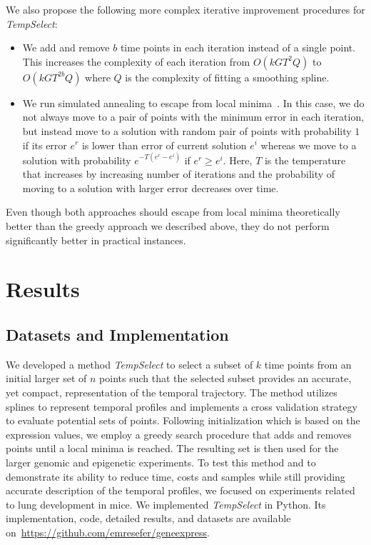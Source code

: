\documentclass[10pt]{article}
\newcommand{\Tempselect}{\textit{TempSelect}\xspace}
\begin{document}
We also propose the following more complex iterative improvement procedures for \Tempselect:

\begin{itemize}
\item We add and remove $b$ time points in each iteration instead of a single point. This increases the complexity of each
  iteration from $O(kGT^{2}Q)$ to $O(kGT^{2b}Q)$ where $Q$ is
  the complexity of fitting a smoothing spline.

\item We run simulated annealing to escape from local
  minima~\cite{kirkpatrick1983}. In this case, we do not always move
  to a pair of points with the minimum error in each iteration, but
  instead move to a solution with random pair of points with probability $1$ if
  its error $e^{r}$ is lower than error of current solution $e^{i}$ whereas we move to a solution with probability
  $e^{-T(e^{r}-e^{i})}$ if $e^{r} \ge e^{i}$. Here, $T$ is the temperature that increases by
  increasing number of iterations and the probability of moving to a solution
  with larger error decreases over time.
\end{itemize}

Even though both approaches should escape from local minima theoretically better than
the greedy approach we described above, they do not perform significantly
better in practical instances.

\section{Results}

\subsection{Datasets and Implementation}

We developed a method \Tempselect to select a subset of $k$ time points from an
initial larger set of $n$ points such that the selected subset provides an accurate, yet compact, representation of the temporal
trajectory. The method utilizes splines to represent temporal profiles and implements a cross
validation strategy to evaluate potential sets of points. Following
initialization which is based on the expression values, we employ a
greedy search procedure that adds and removes points until a local minima is reached. The resulting
set is then used for the larger genomic and epigenetic experiments. To test this method and to demonstrate its ability to reduce time,
costs and samples while still providing accurate description of the
temporal profiles, we focused on experiments related to lung
development in mice. We implemented \Tempselect in Python. Its implementation, code, detailed results, and datasets are available
on~\url{https://github.com/emresefer/geneexpress}. 
\end{document}
